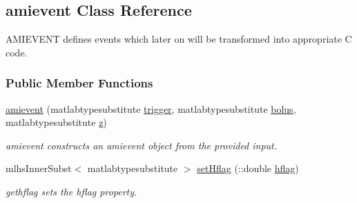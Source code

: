 \hypertarget{classamievent}{}\subsection{amievent Class Reference}
\label{classamievent}


A\+M\+I\+E\+V\+E\+NT defines events which later on will be transformed into appropriate C code.  


\subsubsection*{Public Member Functions}
\begin{DoxyCompactItemize}
\item 
\mbox{\hyperlink{classamievent_a64b7d5a2d9dc65a982f1f9812949b865}{amievent}} (matlabtypesubstitute \mbox{\hyperlink{classamievent_ae194cb817eae4085f8023885100c68dd}{trigger}}, matlabtypesubstitute \mbox{\hyperlink{classamievent_ab9227561ac246ee4b70f9e65c25ffda7}{bolus}}, matlabtypesubstitute \mbox{\hyperlink{classamievent_a25ed1bcb423b0b7200f485fc5ff71c8e}{z}})
\begin{DoxyCompactList}\small\item\em amievent constructs an amievent object from the provided input. \end{DoxyCompactList}\item 
mlhs\+Inner\+Subst$<$ matlabtypesubstitute $>$ \mbox{\hyperlink{classamievent_aef1933f186f69e58e2aa1b00d01f75e7}{set\+Hflag}} (\+::double \mbox{\hyperlink{classamievent_ab98347b5ce6fbe7bd007030346b88575}{hflag}})
\begin{DoxyCompactList}\small\item\em gethflag sets the hflag property. \end{DoxyCompactList}\end{DoxyCompactItemize}
